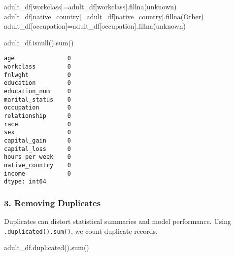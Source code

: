 \documentclass[
  letterpaper,
  DIV=11,
  numbers=noendperiod]{scrartcl}
\newenvironment{Shaded}{\begin{snugshade}}{\end{snugshade}}
\newcommand{\BuiltInTok}[1]{\textcolor[rgb]{0.00,0.23,0.31}{#1}}
\newcommand{\NormalTok}[1]{\textcolor[rgb]{0.00,0.23,0.31}{#1}}
\newcommand{\OperatorTok}[1]{\textcolor[rgb]{0.37,0.37,0.37}{#1}}
\newcommand{\StringTok}[1]{\textcolor[rgb]{0.13,0.47,0.30}{#1}}
\begin{document}
\begin{Shaded}
\begin{Highlighting}[]
\NormalTok{adult\_df[}\StringTok{\textquotesingle{}workclass\textquotesingle{}}\NormalTok{]}\OperatorTok{=}\NormalTok{adult\_df[}\StringTok{\textquotesingle{}workclass\textquotesingle{}}\NormalTok{].fillna(}\StringTok{\textquotesingle{}unknown\textquotesingle{}}\NormalTok{)}
\NormalTok{adult\_df[}\StringTok{\textquotesingle{}native\_country\textquotesingle{}}\NormalTok{]}\OperatorTok{=}\NormalTok{adult\_df[}\StringTok{\textquotesingle{}native\_country\textquotesingle{}}\NormalTok{].fillna(}\StringTok{\textquotesingle{}Other\textquotesingle{}}\NormalTok{)}
\NormalTok{adult\_df[}\StringTok{\textquotesingle{}occupation\textquotesingle{}}\NormalTok{]}\OperatorTok{=}\NormalTok{adult\_df[}\StringTok{\textquotesingle{}occupation\textquotesingle{}}\NormalTok{].fillna(}\StringTok{\textquotesingle{}unknown\textquotesingle{}}\NormalTok{)}
\end{Highlighting}
\end{Shaded}

\begin{Shaded}
\begin{Highlighting}[]
\NormalTok{adult\_df.isnull().}\BuiltInTok{sum}\NormalTok{()}
\end{Highlighting}
\end{Shaded}

\begin{verbatim}
age               0
workclass         0
fnlwght           0
education         0
education_num     0
marital_status    0
occupation        0
relationship      0
race              0
sex               0
capital_gain      0
capital_loss      0
hours_per_week    0
native_country    0
income            0
dtype: int64
\end{verbatim}

\subsubsection{3. Removing Duplicates}\label{removing-duplicates}

Duplicates can distort statistical summaries and model performance.
Using \texttt{.duplicated().sum()}, we count duplicate records.

\begin{Shaded}
\begin{Highlighting}[]
\NormalTok{adult\_df.duplicated().}\BuiltInTok{sum}\NormalTok{()}
\end{Highlighting}
\end{Shaded}
\end{document}
